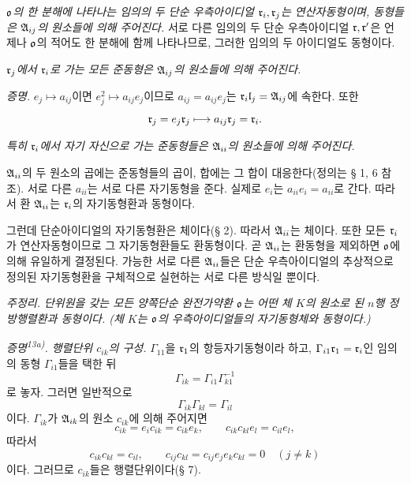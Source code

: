 \emph{\(\mathfrak o\)의 한 분해에 나타나는 임의의 두 단순 우측아이디얼 \(\mathfrak r_i,\mathfrak r_j\)는 연산자동형이며, 동형들은 \(\mathfrak A_{ij}\)의 원소들에 의해 주어진다.} 서로 다른 임의의 두 단순 우측아이디얼 \(\mathfrak r,\mathfrak r'\)은 언제나 \(\mathfrak o\)의 적어도 한 분해에 함께 나타나므로, 그러한 임의의 두 아이디얼도 동형이다.

\emph{\(\mathfrak r_j\)에서 \(\mathfrak r_i\)로 가는 모든 준동형은 \(\mathfrak A_{ij}\)의 원소들에 의해 주어진다.}

\emph{증명.} \(e_j\mapsto a_{ij}\)이면 \(e_j^2\mapsto a_{ij}e_j\)이므로 \(a_{ij}=a_{ij}e_j\)는 \(\mathfrak r_i\mathfrak l_j=\mathfrak A_{ij}\)에 속한다. 또한
\[
        \mathfrak r_j=e_j\mathfrak r_j\longmapsto a_{ij}\mathfrak r_j=\mathfrak r_i.
\]

\emph{특히 \(\mathfrak r_i\)에서 자기 자신으로 가는 준동형들은 \(\mathfrak A_{ii}\)의 원소들에 의해 주어진다.}

\(\mathfrak A_{ii}\)의 두 원소의 곱에는 준동형들의 곱이, 합에는 그 합이 대응한다(정의는 § 1, 6 참조). 서로 다른 \(a_{ii}\)는 서로 다른 자기동형을 준다. 실제로 \(e_i\)는 \(a_{ii}e_i=a_{ii}\)로 간다. 따라서 환 \(\mathfrak A_{ii}\)는 \(\mathfrak r_i\)의 자기동형환과 동형이다.

그런데 단순아이디얼의 자기동형환은 체이다(§ 2). 따라서 \(\mathfrak A_{ii}\)는 체이다. 또한 모든 \(\mathfrak r_i\)가 연산자동형이므로 그 자기동형환들도 환동형이다. 곧 \(\mathfrak A_{ii}\)는 환동형을 제외하면 \(\mathfrak o\)에 의해 유일하게 결정된다. 가능한 서로 다른 \(\mathfrak A_{ii}\)들은 단순 우측아이디얼의 추상적으로 정의된 자기동형환을 구체적으로 실현하는 서로 다른 방식일 뿐이다.

\emph{주정리. 단위원을 갖는 모든 양쪽단순 완전가약환 \(\mathfrak o\)는 어떤 체 \(K\)의 원소로 된 \(n\)행 정방행렬환과 동형이다. (체 \(K\)는 \(\mathfrak o\)의 우측아이디얼들의 자기동형체와 동형이다.)}

\emph{증명\textsuperscript{13a)}. 행렬단위 \(c_{ik}\)의 구성.} \(\Gamma_{11}\)을 \(\mathfrak r_1\)의 항등자기동형이라 하고, \(\Gamma_{i1}\mathfrak r_1=\mathfrak r_i\)인 임의의 동형 \(\Gamma_{i1}\)들을 택한 뒤
\[
        \Gamma_{ik}=\Gamma_{i1}\Gamma_{k1}^{-1}
\]
로 놓자. 그러면 일반적으로
\[
        \Gamma_{ik}\Gamma_{kl}=\Gamma_{il}
\]
이다. \(\Gamma_{ik}\)가 \(\mathfrak A_{ik}\)의 원소 \(c_{ik}\)에 의해 주어지면
\[
        c_{ik}=e_i c_{ik}=c_{ik}e_k,
        \qquad
        c_{ik}c_{kl}e_l=c_{il}e_l,
\]
따라서
\[
        c_{ik}c_{kl}=c_{il},
        \qquad
        c_{ij}c_{kl}=c_{ij}e_j e_k c_{kl}=0\quad(j\ne k)
\]
이다. 그러므로 \(c_{ik}\)들은 행렬단위이다(§ 7).


